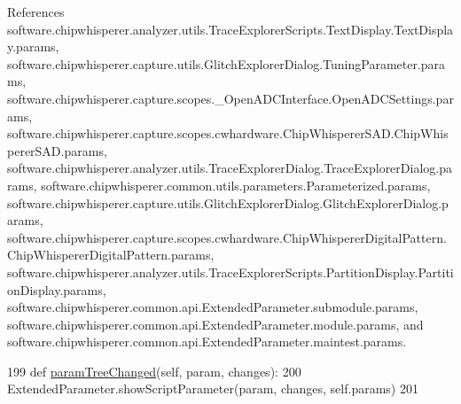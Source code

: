 References software.\+chipwhisperer.\+analyzer.\+utils.\+Trace\+Explorer\+Scripts.\+Text\+Display.\+Text\+Display.\+params, software.\+chipwhisperer.\+capture.\+utils.\+Glitch\+Explorer\+Dialog.\+Tuning\+Parameter.\+params, software.\+chipwhisperer.\+capture.\+scopes.\+\_\+\+Open\+A\+D\+C\+Interface.\+Open\+A\+D\+C\+Settings.\+params, software.\+chipwhisperer.\+capture.\+scopes.\+cwhardware.\+Chip\+Whisperer\+S\+A\+D.\+Chip\+Whisperer\+S\+A\+D.\+params, software.\+chipwhisperer.\+analyzer.\+utils.\+Trace\+Explorer\+Dialog.\+Trace\+Explorer\+Dialog.\+params, software.\+chipwhisperer.\+common.\+utils.\+parameters.\+Parameterized.\+params, software.\+chipwhisperer.\+capture.\+utils.\+Glitch\+Explorer\+Dialog.\+Glitch\+Explorer\+Dialog.\+params, software.\+chipwhisperer.\+capture.\+scopes.\+cwhardware.\+Chip\+Whisperer\+Digital\+Pattern.\+Chip\+Whisperer\+Digital\+Pattern.\+params, software.\+chipwhisperer.\+analyzer.\+utils.\+Trace\+Explorer\+Scripts.\+Partition\+Display.\+Partition\+Display.\+params, software.\+chipwhisperer.\+common.\+api.\+Extended\+Parameter.\+submodule.\+params, software.\+chipwhisperer.\+common.\+api.\+Extended\+Parameter.\+module.\+params, and software.\+chipwhisperer.\+common.\+api.\+Extended\+Parameter.\+maintest.\+params.


\begin{DoxyCode}
199     \textcolor{keyword}{def }\hyperlink{classsoftware_1_1chipwhisperer_1_1common_1_1api_1_1ExtendedParameter_1_1ExtendedParameter_af1c683f13498329d6a1d06401a936bfe}{paramTreeChanged}(self, param, changes):
200         ExtendedParameter.showScriptParameter(param, changes, self.params)
201 
\end{DoxyCode}
\hypertarget{classsoftware_1_1chipwhisperer_1_1common_1_1api_1_1ExtendedParameter_1_1ExtendedParameter_a0e2c123c60b1b6eeb91cc4b0c808e40d}{}
